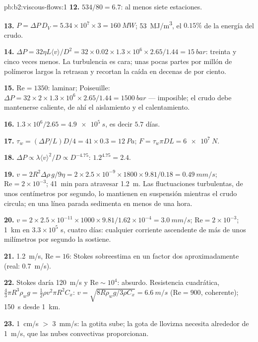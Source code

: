 \begin{solution}{pb:b2:viscous-flows:1}
\textbf{12.} $534/80 = 6.7$: al menos siete estaciones.

\textbf{13.} $P = \Delta P\,D_V = 5.34 \times 10^7 \times 3 = \qty{160}{MW}$;
\qty{53}{MJ/m^3}, el $0.15\%$ de la energía del crudo.

\textbf{14.} $\Delta P = 32\eta L\langle v\rangle/D^2 = 32 \times 0.02 \times 1.3 \times 10^6
\times 2.65/1.44 = \qty{15}{bar}$: treinta y cinco veces menos. La turbulencia
es cara; unas pocas partes por millón de polímeros largos la retrasan y
recortan la caída en decenas de por ciento.

\textbf{15.} $\mathrm{Re} = 1350$: laminar; Poiseuille: $\Delta P = 32 \times 2 \times 1.3 \times
10^6 \times 2.65/1.44 = \qty{1500}{bar}$ --- imposible; el crudo debe mantenerse
caliente, de ahí el aislamiento y el calentamiento.

\textbf{16.} $1.3 \times 10^6/2.65 = \qty{4.9e5}{s}$, es decir $5.7$ días.

\textbf{17.} $\tau_w = (\Delta P/L)D/4 = 41 \times 0.3 = \qty{12}{Pa}$; $F = \tau_w\pi DL =
\qty{6e7}{N}$.

\textbf{18.} $\Delta P \propto \lambda\langle v\rangle^2/D \propto D^{-4.75}$: $1.2^{4.75} = 2.4$.

\textbf{19.} $v = 2R^2\Delta\rho\,g/9\eta = 2 \times 2.5 \times 10^{-9} \times 1800 \times 9.81/
0.18 = \qty{0.49}{mm/s}$; $\mathrm{Re} = 2 \times 10^{-3}$; \qty{41}{min} para
atravesar \qty{1.2}{m}. Las fluctuaciones turbulentas, de unos centímetros
por segundo, lo mantienen en suspensión mientras el crudo circula; en una
línea parada sedimenta en menos de una hora.

\textbf{20.} $v = 2 \times 2.5 \times 10^{-11} \times 1000 \times 9.81/1.62 \times 10^{-4} =
\qty{3.0}{mm/s}$; $\mathrm{Re} = 2 \times 10^{-3}$; \qty{1}{km} en $3.3 \times 10^5$ s, cuatro
días: cualquier corriente ascendente de más de unos milímetros por segundo la sostiene.

\textbf{21.} \qty{1.2}{m/s}, $\mathrm{Re} = 16$: Stokes sobreestima en un factor
dos aproximadamente (real: \qty{0.7}{m/s}).

\textbf{22.} Stokes daría \qty{120}{m/s} y $\mathrm{Re} \sim 10^4$: absurdo.
Resistencia cuadrática, $\tfrac43\pi R^3\rho_wg = \tfrac12\rho v^2\pi R^2C_x$: $v = \sqrt{8R
\rho_wg/3\rho C_x} = \qty{6.6}{m/s}$ ($\mathrm{Re} = 900$, coherente); \qty{150}{s} desde
\qty{1}{km}.

\textbf{23.} \qty{1}{cm/s} $>$ \qty{3}{mm/s}: la gotita sube; la gota de
llovizna necesita alrededor de \qty{1}{m/s}, que las nubes convectivas proporcionan.


\end{solution}
